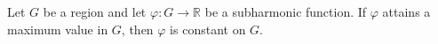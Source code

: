Let $G$ be a region and let $\varphi: G \to \mathbb{R}$ be a subharmonic function. If $\varphi$ attains a maximum value in $G$, then $\varphi$ is constant on $G$.

